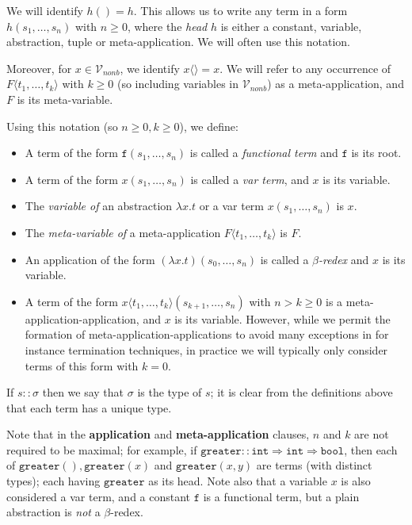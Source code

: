 \documentclass{lmcs}
\theoremstyle{theorem}\newtheorem{theorem}{Theorem}
\theoremstyle{theorem}\newtheorem{lemma}[theorem]{Lemma}
\theoremstyle{theorem}\newtheorem{corollary}[theorem]{Corollary}
\theoremstyle{definition}\newtheorem{definition}[theorem]{Definition}
\theoremstyle{definition}\newtheorem{example}[theorem]{Example}
\newcommand{\Vfree}{\mathcal{V}_{\mathit{nonb}}}
\newcommand{\atype}{\sigma}
\newcommand{\identifier}[1]{\mathtt{#1}}
\newcommand{\afun}{\identifier{f}}
\newcommand{\avar}{x}
\newcommand{\bvar}{y}
\newcommand{\ameta}{F}
\newcommand{\clause}[1]{\textbf{#1}}
\newcommand{\abs}[2]{\lambda #1.#2}
\newcommand{\meta}[2]{#1\langle#2\rangle}
\newcommand{\arrtype}{\Rightarrow}
\newcommand{\symb}[1]{\mathtt{#1}}
\begin{document}
We will identify $h() = h$.  This allows us to write any term in a form $h(s_1,
\dots,s_n)$ with $n \geq 0$, where the \emph{head} $h$ is either a constant,
variable, abstraction, tuple or meta-application.  We will often use this notation.

Moreover, for $\avar \in \Vfree$, we identify $\meta{\avar}{} = \avar$.  We will
refer to any occurrence of $\meta{\ameta}{t_1,\dots,t_k}$ with $k \geq 0$ (so
including variables in $\Vfree$) as a meta-application, and $\ameta$ is its
meta-variable.

Using this notation (so $n \geq 0, k \geq 0$), we define:
\begin{itemize}
\item A term of the form $\afun(s_1,\dots,s_n)$ is called a \emph{functional
  term} and $\afun$ is its root.
\item A term of the form $\avar(s_1,\dots,s_n)$ is called a \emph{var term}, and
  $\avar$ is its variable.
\item The \emph{variable of} an abstraction $\abs{\avar}{t}$ or a var term
  $\avar(s_1,\dots,s_n)$ is $\avar$.
\item The \emph{meta-variable of} a meta-application $\meta{\ameta}{t_1,\dots,
  t_k}$ is $\ameta$.
\item An application of the form $(\abs{\avar}{t})(s_0,\dots,s_n)$ is called a
  \emph{$\beta$-redex} and $\avar$ is its variable.
\item A term of the form $\meta{x}{t_1,\dots,t_k}(s_{k+1},\dots,s_n)$ with
  $n > k \geq 0$ is a meta-application-application, and $\avar$ is its variable.
  However, while we permit the formation of meta-application-applications to
  avoid many exceptions in for instance termination techniques, in practice we
  will typically only consider terms of this form with $k = 0$.
\end{itemize}

If $s :: \atype$ then we say that $\atype$ is the type of $s$; it is clear from
the definitions above that each term has a unique type.

Note that in the \clause{application} and \clause{meta-application} clauses, $n$
and $k$ are not required to be maximal; for example, if $\symb{greater} ::
\mathtt{int} \arrtype \mathtt{int} \arrtype \mathtt{bool}$, then each of
$\symb{greater}(),\symb{greater}(\avar)$ and $\symb{greater}(\avar,\bvar)$ are
terms (with distinct types); each having $\symb{greater}$ as its head.
Note also that a variable $\avar$ is also considered a var term, and a constant
$\afun$ is a functional term, but a plain abstraction is \emph{not} a
$\beta$-redex.
\end{document}
